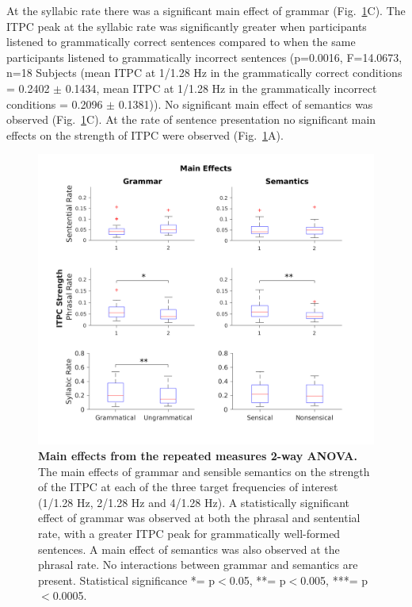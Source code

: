 \documentclass[a4paper,10pt,twoside]{article}
\begin{document}
At the syllabic rate there was a significant main effect of grammar (Fig.~\ref{MainEffects}C). The ITPC peak at the syllabic rate was significantly greater when participants listened to grammatically correct sentences compared to when the same participants listened to grammatically incorrect sentences (p=0.0016, F=14.0673, n=18 Subjects (mean ITPC at 1/1.28 Hz in the grammatically correct conditions = 0.2402 $\pm$ 0.1434, mean ITPC at 1/1.28 Hz in the grammatically incorrect conditions = 0.2096 $\pm$ 0.1381)). No significant main effect of semantics was observed (Fig.~\ref{MainEffects}C). At the rate of sentence presentation no significant main effects on the strength of ITPC were observed (Fig.~\ref{MainEffects}A).



\begin{figure}[tbhp]
\includegraphics[width=\linewidth]{BoxPlots_main_effects.png}
\caption{\textbf{Main effects from the repeated measures 2-way ANOVA.} The main effects of grammar and sensible semantics on the strength of the ITPC at each of the three target frequencies of interest (1/1.28 Hz, 2/1.28 Hz and 4/1.28 Hz). A statistically significant effect of grammar was observed at both the phrasal and sentential rate, with a greater ITPC peak for grammatically well-formed sentences. A main effect of semantics was also observed at the phrasal rate. No interactions between grammar and semantics are present. Statistical significance *= p$<$0.05, **= p$<$0.005, ***= p$<$0.0005.}
\label{MainEffects}
\end{figure}
\end{document}
